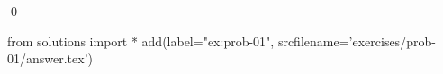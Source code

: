 
\begin{ex} 
  \label{ex:prob-01}
  
  \qed
\end{ex} 
\begin{python0}
from solutions import *
add(label="ex:prob-01",
    srcfilename='exercises/prob-01/answer.tex') 
\end{python0}
